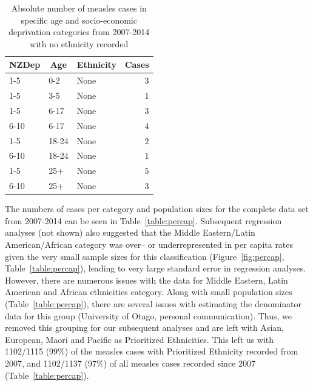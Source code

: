 \documentclass{article}
\begin{document}
\begin{table}[hbtp]
\footnotesize
\begin{center}
\begin{tabular}{lllr}
\hline\hline
\multicolumn{1}{c}{NZDep}&\multicolumn{1}{c}{Age}&\multicolumn{1}{c}{Ethnicity}&\multicolumn{1}{c}{Cases}\tabularnewline
\hline
1-5&0-2&None&$3$\tabularnewline
1-5&3-5&None&$1$\tabularnewline
1-5&6-17&None&$3$\tabularnewline
6-10&6-17&None&$4$\tabularnewline
1-5&18-24&None&$2$\tabularnewline
6-10&18-24&None&$1$\tabularnewline
1-5&25+&None&$5$\tabularnewline
6-10&25+&None&$3$\tabularnewline
\hline
\end{tabular}\end{center}\caption{Absolute number of measles cases in specific age and socio-economic deprivation categories from 2007-2014 with no ethnicity recorded}
\label{table:none}
\end{table}


The numbers of cases per category and population sizes for the complete data set from 2007-2014 can be seen in Table~\ref{table:percap}. Subsequent regression analyses (not shown) also suggested that the Middle Eastern/Latin American/African category was over-- or underrepresented in per capita rates given the very small sample sizes for this classification (Figure~\ref{fig:percap}, Table~\ref{table:percap}), leading to very large standard error in regression analyses. However, there are numerous issues with the data for Middle Eastern, Latin American and African ethnicities category. Along with small population sizes (Table~\ref{table:percap}), there are several issues with estimating the denominator data for this group (University of Otago, personal communication). Thus, we removed this grouping for our subsequent analyses and are left with Asian, European, Maori and Pacific as Prioritized Ethnicities. This left us with 1102/1115 (99\%) of the measles cases with Prioritized Ethnicity recorded from 2007, and 1102/1137 (97\%) of all measles cases recorded since 2007 (Table~\ref{table:percap}).
\end{document}
